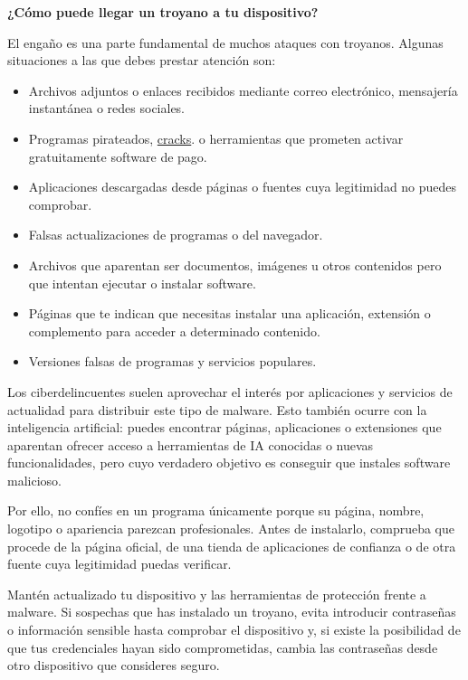 \documentclass[
  spanish,
  a4paper,
  openany]{book}
\begin{document}
\textbf{¿Cómo puede llegar un troyano a tu dispositivo?}

El engaño es una parte fundamental de muchos ataques con troyanos. Algunas situaciones a las que debes prestar atención son:

\begin{itemize}
\item
  Archivos adjuntos o enlaces recibidos mediante correo electrónico, mensajería instantánea o redes sociales.
\item
  Programas pirateados, \href{https://es.wikipedia.org/wiki/Cracking_(software)}{cracks}. o herramientas que prometen activar gratuitamente software de pago.
\item
  Aplicaciones descargadas desde páginas o fuentes cuya legitimidad no puedes comprobar.
\item
  Falsas actualizaciones de programas o del navegador.
\item
  Archivos que aparentan ser documentos, imágenes u otros contenidos pero que intentan ejecutar o instalar software.
\item
  Páginas que te indican que necesitas instalar una aplicación, extensión o complemento para acceder a determinado contenido.
\item
  Versiones falsas de programas y servicios populares.
\end{itemize}

Los ciberdelincuentes suelen aprovechar el interés por aplicaciones y servicios de actualidad para distribuir este tipo de malware. Esto también ocurre con la inteligencia artificial: puedes encontrar páginas, aplicaciones o extensiones que aparentan ofrecer acceso a herramientas de IA conocidas o nuevas funcionalidades, pero cuyo verdadero objetivo es conseguir que instales software malicioso.

Por ello, no confíes en un programa únicamente porque su página, nombre, logotipo o apariencia parezcan profesionales. Antes de instalarlo, comprueba que procede de la página oficial, de una tienda de aplicaciones de confianza o de otra fuente cuya legitimidad puedas verificar.

Mantén actualizado tu dispositivo y las herramientas de protección frente a malware. Si sospechas que has instalado un troyano, evita introducir contraseñas o información sensible hasta comprobar el dispositivo y, si existe la posibilidad de que tus credenciales hayan sido comprometidas, cambia las contraseñas desde otro dispositivo que consideres seguro.
\end{document}
